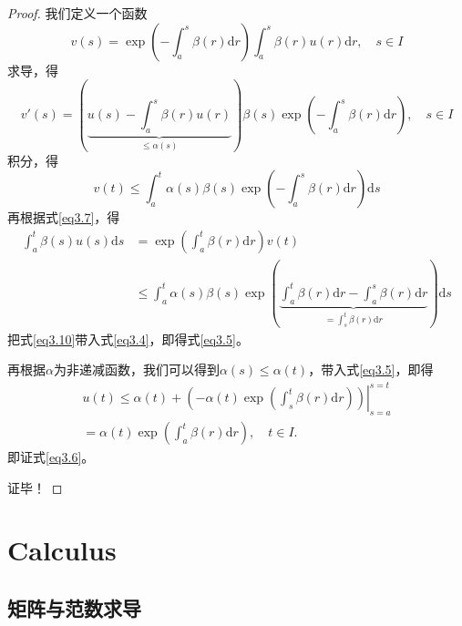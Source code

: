\documentclass[lang=cn,10pt]{elegantbook}
\begin{document}
\begin{proof}
	我们定义一个函数
	\begin{equation}\label{eq3.7}
		v(s)=\exp\left(-\int_a^s\beta(r)\mathrm{d}r\right)\int_a^s\beta(r)u(r)\mathrm{d}r,\quad s\in I
	\end{equation}
	求导，得
	\begin{equation}
		v'(s)=\left(\underbrace{u(s)-\int_a^s\beta(r)u(r)}_{\leq\alpha(s)}\right)\beta(s)\exp\left(-\int_a^s\beta(r)\mathrm{d}r\right),\quad s\in I
	\end{equation}
	积分，得
	\begin{equation}
		v(t)\leq\int_a^t\alpha(s)\beta(s)\exp\left(-\int_a^s\beta(r)\mathrm{d}r\right)\mathrm{d}s
	\end{equation}
	再根据式\ref{eq3.7}，得
	\begin{equation}\label{eq3.10}
		\begin{aligned}
			\int_{a}^{t}\beta(s)u(s)\mathrm{d}s
			 & =\exp\left(\int_a^t\beta(r)\mathrm{d}r\right)v(t)                                                                                                            \\
			 & \leq\int_a^t\alpha(s)\beta(s)\exp\left(\underbrace{\int_a^t\beta(r)\mathrm{d}r-\int_a^s\beta(r)\mathrm{d}r}_{=\int_s^t\beta(r)\mathrm{d}r}\right)\mathrm{d}s
		\end{aligned}
	\end{equation}
	把式\ref{eq3.10}带入式\ref{eq3.4}，即得式\ref{eq3.5}。

	再根据$\alpha$为非递减函数，我们可以得到$\alpha(s)\leq \alpha(t)$，带入式\ref{eq3.5}，即得
	\begin{equation*}
		\begin{gathered}
			u(t)
			\leq\left.\alpha(t)+\left(-\alpha(t)\exp\left(\int_s^t\beta(r)\mathrm{d}r\right)\right)\right|_{s=a}^{s=t} \\
			=\alpha(t)\exp\left(\int_{a}^{t}\beta(r)\mathrm{d}r\right),\quad t\in I.
		\end{gathered}
	\end{equation*}
	即证式\ref{eq3.6}。

	证毕！

\end{proof}

\chapter{Calculus}
\section{矩阵与范数求导}
\end{document}
